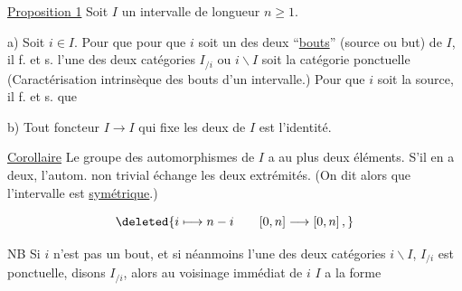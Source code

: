 \uline{Proposition 1} Soit $I$ un intervalle  de longueur $n\geq1$. 

a)  Soit $i\in I$. Pour que   pour que $i$ soit un des deux ``\uline{bouts}''  (source ou but) de $I$, il f. et s.  l'une des deux catégories $I_{/i}$ ou $i\backslash I$ soit  la catégorie ponctuelle  (Caractérisation intrinsèque des bouts d'un intervalle.) Pour que $i$ soit la source, il f. et s. que 


b) Tout foncteur $I\longrightarrow I$ qui fixe les deux  de $I$ est l'identité.


\uline{Corollaire} Le groupe des automorphismes de $I$ a au plus deux éléments. S'il en a deux, l'autom. non trivial échange les deux extrémités. (On dit  alors que l'intervalle est \uline{symétrique}.) 


\[\deleted{i\longmapsto n-i\qquad [0,n]\longrightarrow[0,n]\,,}\]




NB Si $i$ n'est pas un bout, et si néanmoins l'une des deux catégories $i\backslash I$, $I_{/i}$ est ponctuelle, disons $I_{/i}$, alors au voisinage immédiat de $i$ $I$ a la forme


